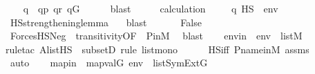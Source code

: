 \begin{isabellebody}
\ \ \isamarkupfalse%
\ q\ \ {\isachardoublequoteopen}q{\isasympreceq}p{\isachardoublequoteclose}\ {\isachardoublequoteopen}q{\isasympreceq}r{\isachardoublequoteclose}\ {\isachardoublequoteopen}q{\isasymin}G{\isachardoublequoteclose}\isanewline
\ \ \ \ \isamarkupfalse%
\ blast\isanewline
\ \ \isamarkupfalse%
\ \isamarkupfalse%
\ calculation\ \isanewline
\ \ \isamarkupfalse%
\ {\isachardoublequoteopen}q\ {\isasymtturnstile}HS\ {\isasymphi}\ env{\isachardoublequoteclose}\isanewline
\ \ \ \ \isamarkupfalse%
\ HS{\isacharunderscore}{\kern0pt}strengthening{\isacharunderscore}{\kern0pt}lemma{\isacharbrackleft}{\kern0pt}\ {\isasymphi}{\isacharequal}{\kern0pt}{\isasymphi}{\isacharbrackright}{\kern0pt}\ \isamarkupfalse%
\ blast\isanewline
\ \ \isamarkupfalse%
\isanewline
\ \ \isamarkupfalse%
\ {\isachardoublequoteopen}False{\isachardoublequoteclose}\isanewline
\ \ \ \ \isamarkupfalse%
\ ForcesHS{\isacharunderscore}{\kern0pt}Neg{\isacharbrackleft}{\kern0pt}\ {\isasymphi}{\isacharequal}{\kern0pt}{\isasymphi}{\isacharbrackright}{\kern0pt}\ transitivity{\isacharbrackleft}{\kern0pt}OF\ {\isacharunderscore}{\kern0pt}\ P{\isacharunderscore}{\kern0pt}in{\isacharunderscore}{\kern0pt}M{\isacharbrackright}{\kern0pt}\ \isamarkupfalse%
\ blast\isanewline
{}\isamarkupfalse%
\isanewline
\ \ \isamarkupfalse%
\ envin\ {\isacharcolon}{\kern0pt}\ {\isachardoublequoteopen}env\ {\isasymin}\ list{\isacharparenleft}{\kern0pt}M{\isacharparenright}{\kern0pt}{\isachardoublequoteclose}\ \isanewline
\ \ \ \ \isamarkupfalse%
{\isacharparenleft}{\kern0pt}rule{\isacharunderscore}{\kern0pt}tac\ A{\isacharequal}{\kern0pt}{\isachardoublequoteopen}list{\isacharparenleft}{\kern0pt}HS{\isacharparenright}{\kern0pt}{\isachardoublequoteclose}\ \ subsetD{\isacharcomma}{\kern0pt}\ rule\ list{\isacharunderscore}{\kern0pt}mono{\isacharparenright}{\kern0pt}\isanewline
\ \ \ \ \isamarkupfalse%
\ HS{\isacharunderscore}{\kern0pt}iff\ P{\isacharunderscore}{\kern0pt}name{\isacharunderscore}{\kern0pt}in{\isacharunderscore}{\kern0pt}M\ assms\isanewline
\ \ \ \ \isamarkupfalse%
\ auto\isanewline
\ \ \isamarkupfalse%
\ mapin\ {\isacharcolon}{\kern0pt}\ {\isachardoublequoteopen}map{\isacharparenleft}{\kern0pt}val{\isacharparenleft}{\kern0pt}G{\isacharparenright}{\kern0pt}{\isacharcomma}{\kern0pt}\ env{\isacharparenright}{\kern0pt}\ {\isasymin}\ list{\isacharparenleft}{\kern0pt}SymExt{\isacharparenleft}{\kern0pt}G{\isacharparenright}{\kern0pt}{\isacharparenright}{\kern0pt}{\isachardoublequoteclose}\ \isanewline

\end{isabellebody}
